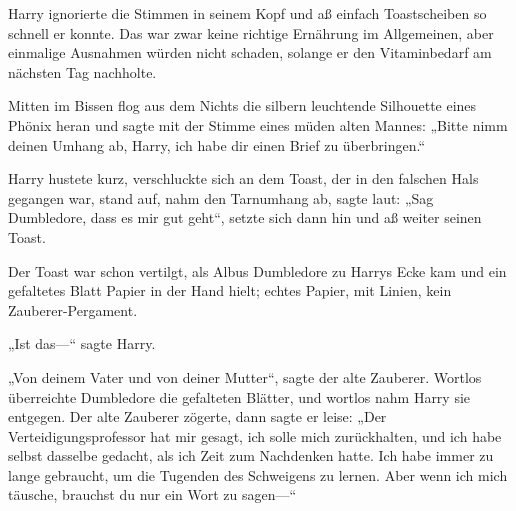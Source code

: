 Harry ignorierte die Stimmen in seinem Kopf und aß einfach Toastscheiben so schnell er konnte. Das war zwar keine richtige Ernährung im Allgemeinen, aber einmalige Ausnahmen würden nicht schaden, solange er den Vitaminbedarf am nächsten Tag nachholte.

Mitten im Bissen flog aus dem Nichts die silbern leuchtende Silhouette eines Phönix heran und sagte mit der Stimme eines müden alten Mannes:
„Bitte nimm deinen Umhang ab, Harry, ich habe dir einen Brief zu überbringen.“

Harry hustete kurz, verschluckte sich an dem Toast, der in den falschen Hals gegangen war, stand auf, nahm den Tarnumhang ab, sagte laut:
„Sag Dumbledore, dass es mir gut geht“, setzte sich dann hin und aß weiter seinen Toast.

Der Toast war schon vertilgt, als Albus Dumbledore zu Harrys Ecke kam und ein gefaltetes Blatt Papier in der Hand hielt; echtes Papier, mit Linien, kein Zauberer-Pergament.

„Ist das—“ sagte Harry.

„Von deinem Vater und von deiner Mutter“, sagte der alte Zauberer. Wortlos überreichte Dumbledore die gefalteten Blätter, und wortlos nahm Harry sie entgegen. Der alte Zauberer zögerte, dann sagte er leise:
„Der Verteidigungsprofessor hat mir gesagt, ich solle mich zurückhalten, und ich habe selbst dasselbe gedacht, als ich Zeit zum Nachdenken hatte. Ich habe immer zu lange gebraucht, um die Tugenden des Schweigens zu lernen. Aber wenn ich mich täusche, brauchst du nur ein Wort zu sagen—“

